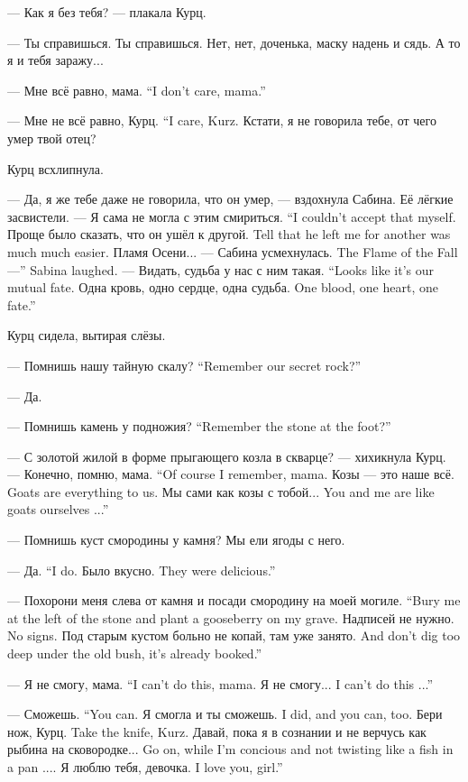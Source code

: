 --- Как я без тебя? --- плакала Курц.

--- Ты справишься.
Ты справишься.
Нет, нет, доченька, маску надень и сядь.
А то я и тебя заражу...

{--- Мне всё равно, мама.}
{``I don't care, mama.''}

{--- Мне не всё равно, Курц.}
{``I care, Kurz.}
Кстати, я не говорила тебе, от чего умер твой отец?

Курц всхлипнула.

--- Да, я же тебе даже не говорила, что он умер, --- вздохнула Сабина.
Её лёгкие засвистели.
{--- Я сама не могла с этим смириться.}
{``I couldn't accept that myself.}
{Проще было сказать, что он ушёл к другой.}
{Tell that he left me for another was much much easier.}
{Пламя Осени... --- Сабина усмехнулась.}
{The Flame of the Fall---'' Sabina laughed.}
{--- Видать, судьба у нас с ним такая.}
{``Looks like it's our mutual fate.}
{Одна кровь, одно сердце, одна судьба.}
{One blood, one heart, one fate.''}

Курц сидела, вытирая слёзы.

{--- Помнишь нашу тайную скалу?}
{``Remember our secret rock?''}

--- Да.

{--- Помнишь камень у подножия?}
{``Remember the stone at the foot?''}

--- С золотой жилой в форме прыгающего козла в скварце? --- хихикнула Курц.
{--- Конечно, помню, мама.}
{``Of course I remember, mama.}
{Козы --- это наше всё.}
{Goats are everything to us.}
{Мы сами как козы с тобой...}
{You and me are like goats ourselves ...''}

--- Помнишь куст смородины у камня?
Мы ели ягоды с него.

{--- Да.}
{``I do.}
{Было вкусно.}
{They were delicious.''}

{--- Похорони меня слева от камня и посади смородину на моей могиле.}
{``Bury me at the left of the stone and plant a gooseberry on my grave.}
{Надписей не нужно.}
{No signs.}
{Под старым кустом больно не копай, там уже занято.}
{And don't dig too deep under the old bush, it's already booked.''}

{--- Я не смогу, мама.}
{``I can't do this, mama.}
{Я не смогу...}
{I can't do this ...''}

{--- Сможешь.}
{``You can.}
{Я смогла и ты сможешь.}
{I did, and you can, too.}
{Бери нож, Курц.}
{Take the knife, Kurz.}
{Давай, пока я в сознании и не верчусь как рыбина на сковородке...}
{Go on, while I'm concious and not twisting like a fish in a pan ....}
{Я люблю тебя, девочка.}
{I love you, girl.''}

